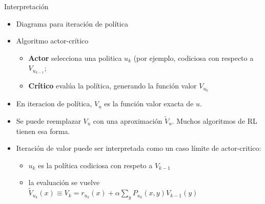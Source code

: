 \documentclass[handout]{beamer}
\begin{document}
\begin{frame}{Interpretación}
\begin{itemize}
\item Diagrama para iteración de política
\item<2-> Algoritmo actor-crítico
\begin{itemize}
\item<3->{\bf Actor} selecciona una politica $u_k$ (por ejemplo, codiciosa con respecto a $V_{u_{k-1}}$;
\item<4->{\bf Crítico} evalúa la política, generando la función valor $V_{u_k}$
\end{itemize}
\item<5-> En iteracion de política, $V_{u}$ es la función valor exacta de $u$.
\item<6-> Se puede reemplazar $V_u$ con una aproximación $\tilde{V}_u$. Muchos algoritmos de RL tienen esa forma.
\item<7-> Iteración de valor puede ser interpretada como un caso límite de actor-critico:
\begin{itemize}
\item $u_k$ es la política codiciosa con respeto a $V_{k-1}$
\item la evaluación se vuelve $\tilde{V}_{u_k}(x) \equiv V_k = r_{u_k}(x)+\alpha\sum_y P_{u_k}(x,y)V_{k-1}(y)$
\end{itemize}
\end{itemize}
\end{frame}
\end{document}
